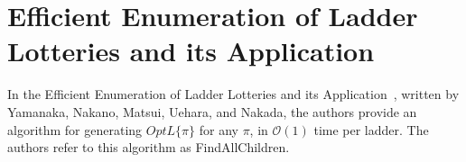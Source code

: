 \section{Efficient Enumeration of Ladder Lotteries and its Application}

In the Efficient Enumeration of Ladder Lotteries and its Application~\cite{A1}, written by Yamanaka, Nakano, Matsui, Uehara, and Nakada, 
the authors provide an algorithm for generating $OptL\{\pi\}$ 
for any $\pi$, in $\mathcal{O}(1)$ time per ladder. The authors refer to this algorithm as {\sc FindAllChildren}.












